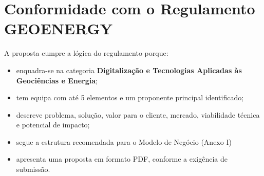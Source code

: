 \documentclass[11pt,a4paper]{article}
\begin{document}
\section{Conformidade com o Regulamento GEOENERGY}
A proposta cumpre a lógica do regulamento porque:
\begin{itemize}
    \item enquadra-se na categoria \textbf{Digitalização e Tecnologias Aplicadas às Geociências e Energia};
    \item tem equipa com até 5 elementos e um proponente principal identificado;
    \item descreve problema, solução, valor para o cliente, mercado, viabilidade técnica e potencial de impacto;
    \item segue a estrutura recomendada para o Modelo de Negócio (Anexo I)
    \item apresenta uma proposta em formato PDF, conforme a exigência de submissão.
\end{itemize}
\end{document}
